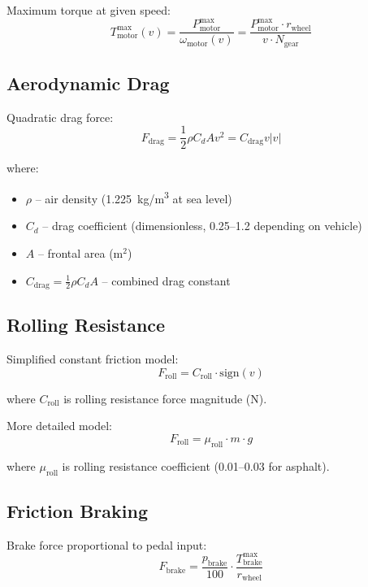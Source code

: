 \documentclass[11pt,a4paper]{article}
\begin{document}
Maximum torque at given speed:
\begin{equation}
T_{\text{motor}}^{\max}(v) = \frac{P_{\text{motor}}^{\max}}{\omega_{\text{motor}}(v)} = \frac{P_{\text{motor}}^{\max} \cdot r_{\text{wheel}}}{v \cdot N_{\text{gear}}}
\end{equation}

\subsection{Aerodynamic Drag}

Quadratic drag force:
\begin{equation}
F_{\text{drag}} = \frac{1}{2} \rho C_d A v^2 = C_{\text{drag}} v |v|
\end{equation}

where:
\begin{itemize}
    \item $\rho$ -- air density (\SI{1.225}{kg/m^3} at sea level)
    \item $C_d$ -- drag coefficient (dimensionless, 0.25--1.2 depending on vehicle)
    \item $A$ -- frontal area (m$^2$)
    \item $C_{\text{drag}} = \frac{1}{2}\rho C_d A$ -- combined drag constant
\end{itemize}

\subsection{Rolling Resistance}

Simplified constant friction model:
\begin{equation}
F_{\text{roll}} = C_{\text{roll}} \cdot \text{sign}(v)
\end{equation}

where $C_{\text{roll}}$ is rolling resistance force magnitude (N).

More detailed model:
\begin{equation}
F_{\text{roll}} = \mu_{\text{roll}} \cdot m \cdot g
\end{equation}

where $\mu_{\text{roll}}$ is rolling resistance coefficient (0.01--0.03 for asphalt).

\subsection{Friction Braking}

Brake force proportional to pedal input:
\begin{equation}
F_{\text{brake}} = \frac{p_{\text{brake}}}{100} \cdot \frac{T_{\text{brake}}^{\max}}{r_{\text{wheel}}}
\end{equation}
\end{document}
